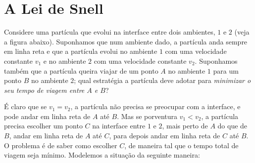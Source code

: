 \section{A Lei de Snell}
Considere uma partícula que evolui na interface entre dois ambientes,
$1$ e $2$ (veja a figura abaixo).
Suponhamos que num ambiente dado, a partícula anda sempre em linha reta e que a
partícula evolui no ambiente $1$ com uma 
velocidade constante $v_1$ e no ambiente $2$ com uma velocidade constante
$v_{2}$.
Suponhamos também que a partícula queira viajar de um ponto $A$ no
ambiente $1$ para um ponto $B$ no ambiente $2$; qual estratégia a
partícula deve adotar
para \emph{minimizar o seu tempo de viagem entre $A$ e $B$}? 
\begin{center}
\begin{bmlimage}\end{bmlimage}
\end{center}
É claro que se $v_1=v_2$, a partícula não precisa se preocupar com  a
interface, e pode andar em linha reta de $A$ até $B$. Mas se porventura
$v_1<v_2$, a partícula precisa escolher um ponto $C$ na
interface entre $1$ e $2$, mais perto de $A$ do que de $B$, andar em linha reta
de $A$ até $C$, para depois andar em linha reta de $C$ até $B$.
O problema é de saber como escolher $C$, de maneira tal que o tempo total de
viagem seja mínimo. Modelemos a situação da seguinte maneira:

